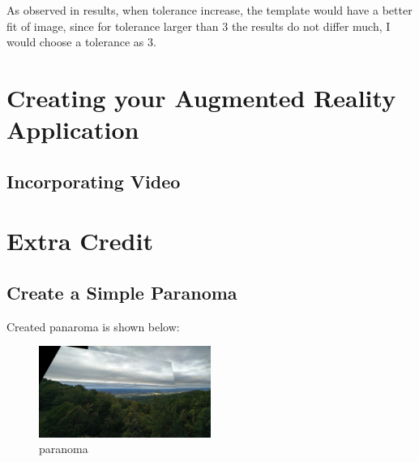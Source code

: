 \documentclass[11pt]{article} \usepackage{fullpage} \usepackage{graphicx} \usepackage{epstopdf} \usepackage{color} \usepackage{psfrag} \usepackage{pdfsync}\usepackage{indentfirst}\usepackage{subfigure}\usepackage{float}\usepackage[section]{placeins}
\begin{document}
As observed in results, when tolerance increase, the template would have a better fit of image, since for tolerance larger than $3$ the results do not differ much, I would choose a tolerance as $3$.

\section{Creating your Augmented Reality Application}
\setcounter{subsection}{0}
\subsection{Incorporating Video}

\section{Extra Credit}
\setcounter{subsection}{1}
\subsection{Create a Simple Paranoma}

Created panaroma is shown below:
\begin{figure}[H]
\centering
\includegraphics[width=0.5\textwidth]{results/pana.png}
\caption{paranoma}
\end{figure}
\end{document}
